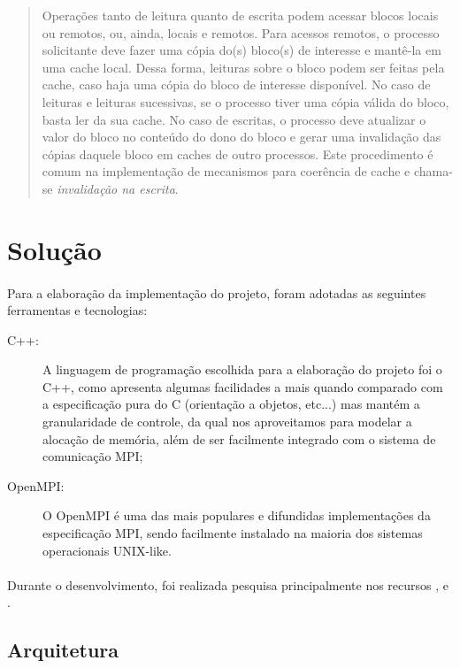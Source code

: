 \documentclass[12pt]{article}
\begin{document}
\begin{quote}
  Operações tanto de leitura quanto de escrita podem acessar blocos locais ou remotos, ou, ainda, locais e remotos. Para acessos remotos, o processo solicitante deve fazer uma cópia do(s) bloco(s) de interesse e mantê-la em uma cache local. Dessa forma, leituras sobre o bloco podem ser feitas pela cache, caso haja uma cópia do bloco de interesse disponível.
  No caso de leituras e leituras sucessivas, se o processo tiver uma cópia válida do bloco, basta ler da sua cache. No
  caso de escritas, o processo deve atualizar o valor do bloco no conteúdo do dono do bloco e gerar uma invalidação das
  cópias daquele bloco em caches de outro processos. Este procedimento é comum na implementação de mecanismos para
  coerência de cache e chama-se \textit{invalidação na escrita}.
\end{quote}

\section{Solução}
\paragraph{}
Para a elaboração da implementação do projeto, foram adotadas as seguintes ferramentas e tecnologias:

\begin{description}
  \item[C++:] A linguagem de programação escolhida para a elaboração do projeto foi o C++, como apresenta algumas
    facilidades a mais quando comparado com a especificação pura do C (orientação a objetos, etc...) mas mantém a
    granularidade de controle, da qual nos aproveitamos para modelar a alocação de memória, além de ser facilmente
    integrado com o sistema de comunicação MPI;
  \item[OpenMPI:] O OpenMPI é uma das mais populares e difundidas implementações da especificação MPI, sendo facilmente
    instalado na maioria dos sistemas operacionais UNIX-like.
\end{description}

\paragraph{}
Durante o desenvolvimento, foi realizada pesquisa principalmente nos recursos \cite{mpitutorial}, \cite{openmpi} e
\cite{cppreference}.


\subsection{Arquitetura}
\end{document}
